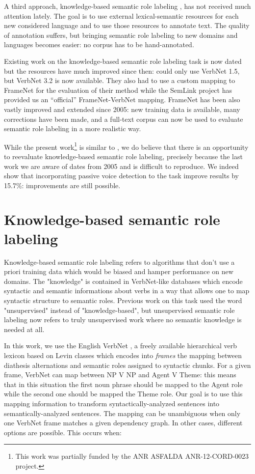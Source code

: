 A third approach, knowledge-based semantic role labeling
\citep{swier2004unsupervised,swier2005exploiting}, has not received much
attention lately. The goal is to use external lexical-semantic resources for
each new considered language and to use those resources to annotate text. The
quality of annotation suffers, but bringing semantic role labeling to new
domains and languages becomes easier: no corpus has to be hand-annotated.

Existing work on the knowledge-based semantic role labeling task is now dated
but the resources have much improved since then:
\citep{swier2005exploiting} could only use VerbNet 1.5, but VerbNet 3.2 is
now available. They also had to use a custom mapping to FrameNet for the evaluation 
of their method while the SemLink project has provided us an ``official'' 
FrameNet-VerbNet mapping. FrameNet has been also vastly
improved and extended since 2005: new training data is available, many
corrections have been made, and a full-text corpus can now be used to evaluate
semantic role labeling in a more realistic way.

While the present work\footnote{This work was partially funded by the ANR
ASFALDA ANR-12-CORD-0023 project.} is similar to
\citep{swier2005exploiting}, we do believe that there is an opportunity to
reevaluate knowledge-based semantic role labeling, precisely because the last
work we are aware of dates from 2005 and is difficult to reproduce. We indeed
show that incorporating passive voice detection to the task improve results by
15.7\%: improvements are still possible.

\section{Knowledge-based semantic role labeling}
\label{sec:srl}

Knowledge-based semantic role labeling refers to algorithms that don't use a
priori training data which would be biased and hamper performance on new
domains. The "knowledge" is contained in VerbNet-like databases which encode
syntactic and semantic informations about verbs in a way that allows one to map
syntactic structure to semantic roles. Previous work on this task used the word
"unsupervised" instead of "knowledge-based", but unsupervised semantic role
labeling now refers to truly unsupervised work where no semantic knowledge is
needed at all.

In this work, we use the English VerbNet \citep{kipperschuler2005verbnet}, a
freely available hierarchical verb lexicon based on Levin classes
\citep{levin1993english} which encodes into \emph{frames} the mapping
between diathesis alternations and semantic roles assigned to syntactic chunks.
For a given frame, VerbNet can map between NP V NP and Agent V Theme: this
means that in this situation the first noun phrase should be mapped to the
Agent role while the second one should be mapped the Theme role. Our goal is to
use this mapping information to transform syntactically-analyzed sentences into
semantically-analyzed sentences. The mapping can be unambiguous when only one
VerbNet frame matches a given dependency graph. In other cases, different options are
possible. This occurs when: 

